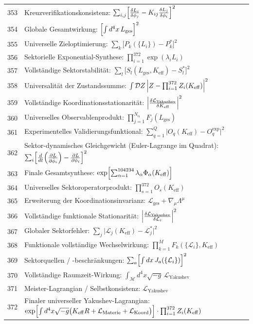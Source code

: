\documentclass[11pt,a4paper]{article}
\begin{document}
\begin{longtable}{r l}
		353 & Kreuzverifikationskonsistenz: $\sum_{i,j}\Bigl[\frac{\delta L_i}{\delta\phi_j} - K_{ij}\frac{\delta L_j}{\delta\phi_i}\Bigr]^2$ \\
		354 & Globale Gesamtwirkung: $\Bigl[\int d^4x\,L_{\text{ges}}\Bigr]^2$ \\
		355 & Universelle Zieloptimierung: $\sum_k\bigl[P_k(\{L_i\}) - P_k^*\bigr]^2$ \\
		356 & Sektorielle Exponential-Synthese: $\prod_{i=1}^{372}\exp(\lambda_i L_i)$ \\
		357 & Vollständige Sektorstabilität: $\sum_l\bigl[S_l(L_{\text{ges}},K_{\mathrm{eff}}) - S_l^*\bigr]^2$ \\
		358 & Universalität der Zustandssumme: $\int\mathcal{D}Z\,\Bigl|Z - \prod_{i=1}^{372}Z_i(K_{\mathrm{eff}})\Bigr|^2$ \\
		359 & Vollständige Koordinationsstationarität: $\Bigl|\frac{\delta\mathcal{L}_{\text{Yakushev}}}{\delta K_{\mathrm{eff}}}\Bigr|^2$ \\
		360 & Universelles Observablenprodukt: $\prod_{j=1}^{N_\alpha}F_j(L_{\text{ges}})$ \\
		361 & Experimentelles Validierungsfunktional: $\sum_{q=1}^Q\bigl|O_q(K_{\mathrm{eff}}) - O_q^{\text{exp}}\bigr|^2$ \\
		362 & Sektor-dynamisches Gleichgewicht (Euler-Lagrange im Quadrat): $\sum_i\Bigl[\frac{d}{dt}\Bigl(\frac{\partial L}{\partial\dot\phi_i}\Bigr) - \frac{\partial L}{\partial\phi_i}\Bigr]^2$ \\
		363 & Finale Gesamtsynthese: $\exp\Bigl[\sum_{\alpha=1}^{104234}\lambda_\alpha\Phi_\alpha(K_{\mathrm{eff}})\Bigr]$ \\
		364 & Universelles Sektoroperatorprodukt: $\prod_{s=1}^{372}O_s(K_{\mathrm{eff}})$ \\
		365 & Erweiterung der Koordinationsinvarianz: $\mathcal{L}_{\text{ges}} + \nabla_\mu\Lambda^\mu$ \\
		366 & Vollständige funktionale Stationarität: $\Bigl|\frac{\delta\mathcal{L}_{\text{Yakushev}}}{\delta\mathcal{L}_i}\Bigr|^2$ \\
		367 & Globaler Sektorfehler: $\sum_j\bigl|\mathcal{L}_j(K_{\mathrm{eff}}) - \mathcal{L}_j^*\bigr|^2$ \\
		368 & Funktionale vollständige Wechselwirkung: $\prod_{k=1}^M F_k(\{\mathcal{L}_i\},K_{\mathrm{eff}})$ \\
		369 & Sektorquellen / -beschränkungen: $\sum_a\Bigl[\int dx\,J_a(\{\mathcal{L}_i\})\Bigr]^2$ \\
		370 & Vollständige Raumzeit-Wirkung: $\int_{\mathcal{M}} d^4x\sqrt{-g}\,\mathcal{L}_{\text{Yakushev}}$ \\
		371 & Meister-Lagrangian / Selbstkonsistenz: $\mathcal{L}_{\text{Yakushev}}$ \\
		372 & Finaler universeller Yakushev-Lagrangian: \scriptsize $\exp\Bigl[\int d^4x\sqrt{-g}\bigl(K_{\mathrm{eff}}R + \mathcal{L}_{\text{Materie}} + \mathcal{L}_{\text{Koord}}\bigr)\Bigr]\cdot\prod_{i=1}^{372}Z_i(K_{\mathrm{eff}})$ \\
		
		\hline
	\end{longtable}
	
\end{document}
